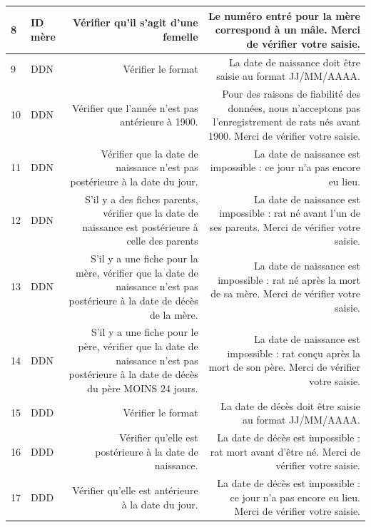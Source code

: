 ﻿\documentclass[a4paper,10pt]{article}
\begin{document}
\begin{tabularx}{\textwidth}{|l|l|R|R|}
8 & ID mère & Vérifier qu'il s'agit d'une femelle & Le numéro entré pour la mère correspond à un mâle. Merci de vérifier votre saisie. \\\hline


9 & DDN & Vérifier le format & La date de naissance doit être saisie au format JJ/MM/AAAA.\\\hline


10 & DDN & Vérifier que l'année n'est pas antérieure à 1900. & Pour des raisons de fiabilité des données, nous n'acceptons pas l'enregistrement de rats nés avant 1900. Merci de vérifier votre saisie.\\\hline


11 & DDN & Vérifier que la date de naissance n'est pas postérieure à la date du jour.& La date de naissance est impossible : ce jour n'a pas encore eu lieu.\\\hline


12 & DDN & S'il y a des fiches parents, vérifier que la date de naissance est postérieure à celle des parents & La date de naissance est impossible : rat né avant l'un de ses parents. Merci de vérifier votre saisie.\\\hline


13 & DDN & S'il y a une fiche pour la mère, vérifier que la date de naissance n'est pas postérieure à la date de décès de la mère. & La date de naissance est impossible : rat né après la mort de sa mère. Merci de vérifier votre saisie.\\\hline


14 & DDN & S'il y a une fiche pour le père, vérifier que la date de naissance n'est pas postérieure à la date de décès du père MOINS 24 jours. & La date de naissance est impossible : rat conçu après la mort de son père. Merci de vérifier votre saisie.\\\hline


15 & DDD & Vérifier le format & La date de décès doit être saisie au format JJ/MM/AAAA.\\\hline


16 & DDD & Vérifier qu'elle est postérieure à la date de naissance. & La date de décès est impossible : rat mort avant d'être né. Merci de vérifier votre saisie.\\\hline


17 & DDD & Vérifier qu'elle est antérieure à la date du jour. & La date de décès est impossible : ce jour n'a pas encore eu lieu. Merci de vérifier votre saisie.\\\hline



\end{tabularx}
\end{document}
